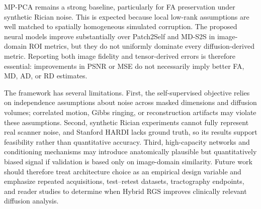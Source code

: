\documentclass[preprint,12pt]{elsarticle}
\begin{document}
MP-PCA remains a strong baseline, particularly for FA preservation under synthetic Rician noise. This is expected because local low-rank assumptions are well matched to spatially homogeneous simulated corruption. The proposed neural models improve substantially over Patch2Self and MD-S2S in image-domain ROI metrics, but they do not uniformly dominate every diffusion-derived metric. Reporting both image fidelity and tensor-derived errors is therefore essential: improvements in PSNR or MSE do not necessarily imply better FA, MD, AD, or RD estimates.

The framework has several limitations. First, the self-supervised objective relies on independence assumptions about noise across masked dimensions and diffusion volumes; correlated motion, Gibbs ringing, or reconstruction artifacts may violate these assumptions. Second, synthetic Rician experiments cannot fully represent real scanner noise, and Stanford HARDI lacks ground truth, so its results support feasibility rather than quantitative accuracy. Third, high-capacity networks and conditioning mechanisms may introduce anatomically plausible but quantitatively biased signal if validation is based only on image-domain similarity. Future work should therefore treat architecture choice as an empirical design variable and emphasize repeated acquisitions, test--retest datasets, tractography endpoints, and reader studies to determine when Hybrid RGS improves clinically relevant diffusion analysis.
\end{document}
